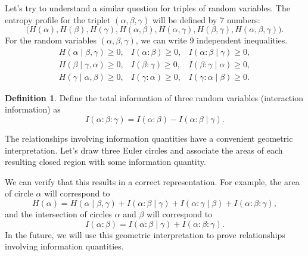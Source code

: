\documentclass[12pt,sans]{article}
\theoremstyle{definition}
\newtheorem{definition}{Definition}[section]
\theoremstyle{plain}
\theoremstyle{remark}
\begin{document}
Let’s try to understand a similar question for triples of random variables. The entropy profile for the triplet \((\alpha, \beta, \gamma)\) will be defined by 7 numbers:
\[
\bigl(H(\alpha), H(\beta), H(\gamma), H(\alpha, \beta), H(\alpha, \gamma),
H(\beta, \gamma), H(\alpha, \beta, \gamma)\bigr).
\]
For the random variables \((\alpha, \beta, \gamma)\), we can write 9 independent inequalities.
\begin{equation*}
\begin{array}{lll}
H(\alpha \mid \beta, \gamma) \ge 0, & I(\alpha : \beta) \ge 0, & I(\alpha : \beta \mid \gamma) \ge 0,\\
H(\beta \mid \gamma, \alpha) \ge 0, & I(\beta : \gamma) \ge 0, & I(\beta : \gamma \mid \alpha) \ge 0,\\
H(\gamma \mid \alpha, \beta) \ge 0, & I(\gamma : \alpha) \ge 0, & I(\gamma : \alpha \mid \beta) \ge 0.
\end{array}
\end{equation*}
\begin{definition}
Define the total information of three random variables (interaction information) as
\[
    I(\alpha : \beta : \gamma) = I(\alpha : \beta) - I(\alpha : \beta \mid \gamma).
\]
\end{definition}

The relationships involving information quantities have a convenient geometric interpretation. Let’s draw three Euler circles and associate the areas of each resulting closed region with some information quantity.
    \begin{center}
    \end{center}
We can verify that this results in a correct representation. For example, the area of circle \(\alpha\) will correspond to
\[
H(\alpha) = H(\alpha \mid \beta, \gamma) + I(\alpha : \beta \mid \gamma)
+ I(\alpha : \gamma \mid \beta) + I(\alpha : \beta : \gamma),
\]
and the intersection of circles \(\alpha\) and \(\beta\) will correspond to
\[
I(\alpha : \beta) = I(\alpha : \beta \mid \gamma) + I(\alpha : \beta : \gamma).
\]
In the future, we will use this geometric interpretation to prove relationships involving information quantities.
\end{document}
